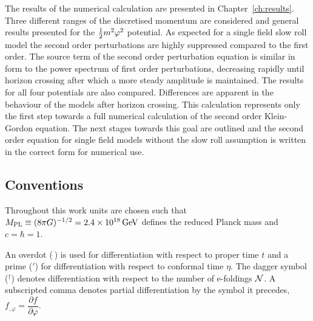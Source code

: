 The results of the numerical calculation are presented in Chapter~\ref{ch:results}.
Three different ranges of the discretised momentum are considered and general
results presented for the $\frac{1}{2} m^2 \varphi^2$ potential. 
As expected for a single field slow
roll model the second order perturbations are highly suppressed compared to the
first order. 
The source term of the second order perturbation equation is similar in form to the
power spectrum of first order perturbations, decreasing rapidly until horizon
crossing after which a more steady amplitude is maintained.
% 
% 
The results for all four potentials are also compared. Differences are apparent in
the behaviour of the models after horizon crossing.
This calculation represents only the first step towards a full numerical calculation
of the second order Klein-Gordon equation. The next stages towards this goal are
outlined and the second order equation for single field models without the slow roll
assumption is written in the correct form for numerical use.







\subsection*{Conventions}
\label{sec:conventions}
Throughout this work units are chosen such that $M_{\mathrm{PL}} \equiv (8\pi G )^{-1/2}=
2.4 \times 10^{18}\, {\rm GeV}$ defines the reduced Planck mass and $c=\hbar =1$. 

An overdot ($\dot{~}$) is used for differentiation with respect to proper
time $t$ and a prime ($'$) for differentiation with respect to conformal time
$\eta$. The dagger symbol ($^\dagger$) denotes differentiation with respect to the
number of e-foldings $\mathcal{N}$.
% 
A subscripted comma denotes partial differentiation by the symbol it
precedes, \eg $f_{,\varphi} = \dfrac{\partial f}{\partial \varphi}$.


